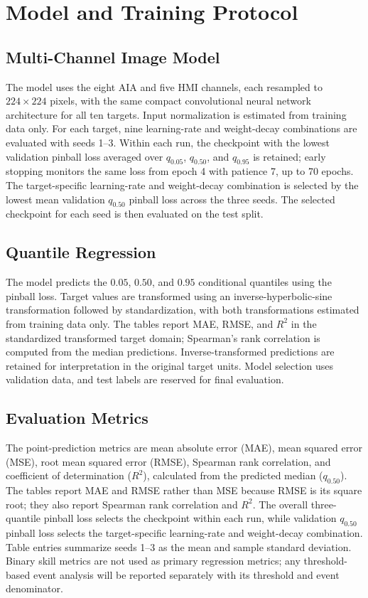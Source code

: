 \documentclass[12pt]{report}
\begin{document}
\section{Model and Training Protocol}

\subsection{Multi-Channel Image Model}

The model uses the eight AIA and five HMI channels, each resampled to $224\times224$ pixels, with the same compact convolutional neural network architecture for all ten targets. Input normalization is estimated from training data only. For each target, nine learning-rate and weight-decay combinations are evaluated with seeds 1--3. Within each run, the checkpoint with the lowest validation pinball loss averaged over $q_{0.05}$, $q_{0.50}$, and $q_{0.95}$ is retained; early stopping monitors the same loss from epoch 4 with patience 7, up to 70 epochs. The target-specific learning-rate and weight-decay combination is selected by the lowest mean validation $q_{0.50}$ pinball loss across the three seeds. The selected checkpoint for each seed is then evaluated on the test split.

\subsection{Quantile Regression}

The model predicts the $0.05$, $0.50$, and $0.95$ conditional quantiles using the pinball loss. Target values are transformed using an inverse-hyperbolic-sine transformation followed by standardization, with both transformations estimated from training data only. The tables report MAE, RMSE, and $R^2$ in the standardized transformed target domain; Spearman's rank correlation is computed from the median predictions. Inverse-transformed predictions are retained for interpretation in the original target units. Model selection uses validation data, and test labels are reserved for final evaluation.

\subsection{Evaluation Metrics}

The point-prediction metrics are mean absolute error (MAE), mean squared error (MSE), root mean squared error (RMSE), Spearman rank correlation, and coefficient of determination ($R^2$), calculated from the predicted median ($q_{0.50}$). The tables report MAE and RMSE rather than MSE because RMSE is its square root; they also report Spearman rank correlation and $R^2$. The overall three-quantile pinball loss selects the checkpoint within each run, while validation $q_{0.50}$ pinball loss selects the target-specific learning-rate and weight-decay combination. Table entries summarize seeds 1--3 as the mean and sample standard deviation. Binary skill metrics are not used as primary regression metrics; any threshold-based event analysis will be reported separately with its threshold and event denominator.
\end{document}
